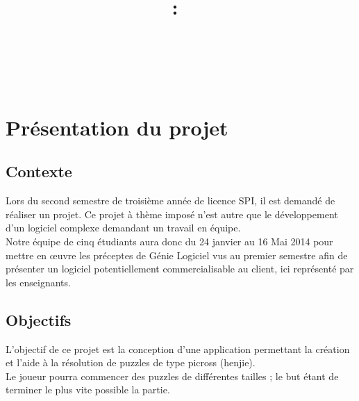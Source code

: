 \documentclass[11pt]{article}
\title{
\pagenumbering{roman} \setcounter{page}{0} %
\vspace{2in}
\textmd{\textbf{\hmwkClass:\ \hmwkTitle}}\\
\normalsize\vspace{0.1in}\small{\hmwkDueDate}\\
\vspace{0.1in}\large{\textit{\hmwkClassInstructor\ }}
\vspace{3in}
}
\author{\textbf{\hmwkAuthorName}}
\date{\hmwkAuthorClasse} %
\begin{document}
\thispagestyle{empty}
\maketitle
\newpage




\thispagestyle{empty}
 \setcounter{page}{0} %
\renewcommand\contentsname{Sommaire}
\tableofcontents
\newpage



\section{Présentation du projet}

\subsection{Contexte}

Lors du second semestre de troisième année de licence SPI, il est demandé de réaliser un projet. Ce projet à thème imposé n'est autre que le développement d'un logiciel complexe demandant un travail en équipe.\\
Notre équipe de cinq étudiants aura donc du 24 janvier au 16 Mai 2014 pour mettre en œuvre les préceptes de Génie Logiciel vus au premier semestre afin de présenter un logiciel potentiellement commercialisable au client, ici représenté par les enseignants.

\subsection{Objectifs}

L'objectif de ce projet est la conception d'une application permettant la création et l'aide à la résolution de puzzles de type picross (henjie).\\
Le joueur pourra commencer des puzzles de différentes tailles ; le but étant de terminer le plus vite possible la partie.
\end{document}
